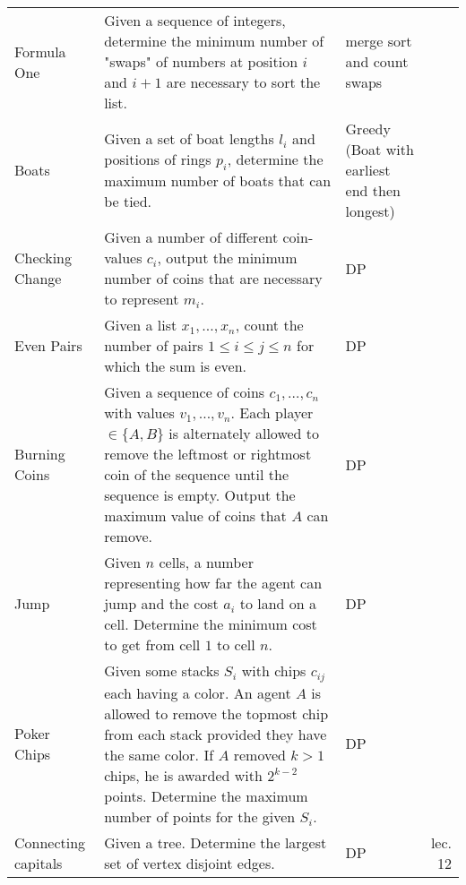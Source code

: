\documentclass[a4paper, 10pt]{article}
\begin{document}
\begin{longtable}{ L{2cm} L{8cm} L{4cm} r}
        Formula One 
        & Given a sequence of integers, determine the minimum number of "swaps" of numbers at position $i$ and $i+1$ are necessary to sort the list. 
        & merge sort and count swaps &  \pageref{sec:formula_one} \\

        Boats 
        & Given a set of boat lengths $l_i$ and positions of rings $p_i$, determine the maximum number of boats that can be tied.
        & Greedy (Boat with earliest end then longest) &  \pageref{sec:boats} \\

        Checking Change 
        & Given a number of different coin-values $c_i$, 
            output the minimum number of coins that are necessary to represent $m_i$.
        & DP       & \pageref{sec:checking_change} \\

        Even Pairs 
        & Given a list $x_1,\dots,x_n$, count the number of pairs $1\leq i\leq j \leq n$ for which 
            the sum is even.
        & DP &  \pageref{sec:even_pairs} \\

        Burning Coins 
        & Given a sequence of coins $c_1, \dots, c_n$ with values $v_1,\dots,v_n$. 
            Each player $\in \{A,B\}$ is alternately allowed to remove the leftmost or rightmost coin of the sequence until the sequence is empty. 
            Output the maximum value of coins that $A$ can remove. 
        & DP &  \pageref{sec:burning_coins} \\

        Jump 
        & Given $n$ cells, a number representing how far the agent can jump and the cost $a_i$ to land on a cell. 
            Determine the minimum cost to get from cell $1$ to cell $n$.        
        & DP &  \pageref{sec:jump} \\

        Poker Chips 
        & Given some stacks $S_i$ with chips $c_{ij}$ each having a color. 
            An agent $A$ is allowed to remove the topmost chip from each stack provided they have the same color.
            If $A$ removed $k>1$ chips, he is awarded with $2^{k-2}$ points. 
            Determine the maximum number of points for the given $S_i$.          
            & DP &  \pageref{sec:poker_chips} \\

        Connecting capitals 
        & Given a tree. 
        Determine the largest set of vertex disjoint edges.
        & DP &  lec. 12 \\



\end{longtable}
\end{document}
